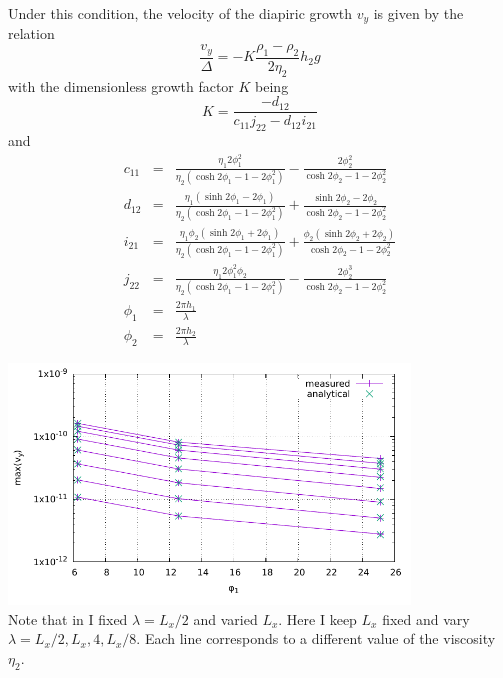 Under this condition, the velocity of the diapiric growth
$v_y$ is given by the relation
\[
\frac{v_y}{\Delta} = - K \frac{\rho_1-\rho_2}{2 \eta_2} h_2 g
\]
with the dimensionless growth factor $K$ being
\[
K=\frac{-d_{12}}{c_{11}j_{22}-d_{12}i_{21}}
\]
and 
\begin{eqnarray}
c_{11} &=& \frac{\eta_1 2 \phi_1^2}{\eta_2(\cosh 2\phi_1 - 1 - 2\phi_1^2)} - \frac{2\phi_2^2}{\cosh 2\phi_2 - 1 - 2 \phi_2^2}\\
d_{12} &=& \frac{\eta_1(\sinh 2\phi_1 -2\phi_1)}{\eta_2(\cosh 2\phi_1 -1 -2\phi_1^2)} + \frac{\sinh 2\phi_2 - 2\phi_2}{\cosh 2\phi_2 -1 -2\phi_2^2} \\
i_{21} &=& \frac{\eta_1\phi_2 (\sinh 2 \phi_1 + 2 \phi_1)}{\eta_2(\cosh 2\phi_1 -1 -2\phi_1^2)} 
+ \frac{\phi_2 (\sinh 2\phi_2 + 2\phi_2)}{\cosh 2\phi_2 -1 -2\phi_2^2} \\
j_{22} &=& \frac{\eta_1 2 \phi_1^2 \phi_2}{\eta_2(\cosh 2\phi_1 -1-2\phi_1^2)} - \frac{2\phi_2^3}{ \cosh 2\phi_2 -1 -2\phi_2^2}\\
\phi_1&=&\frac{2\pi h_1}{\lambda}\\
\phi_2&=&\frac{2\pi h_2}{\lambda}
\end{eqnarray}


\begin{center}
  \includegraphics[width=0.8\textwidth]{python_codes/fieldstone_40/plot}\\
  {\small  Note that in \cite{thie11} I fixed $\lambda=L_x/2$ and varied $L_x$. Here I keep $L_x$ fixed
  and vary $\lambda=L_x/2,L_x,4,L_x/8$. Each line corresponds to a different value of the viscosity $\eta_2$.} 
\end{center}


